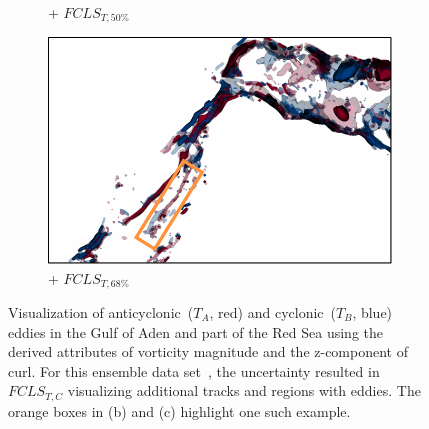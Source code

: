 \begin{figure}[!h]
\begin{subfigure}{0.245\linewidth}
\vspace{-5mm}
\caption{+ $FCLS_{T,50\%}$}
\label{fig:rse_fls}
\end{subfigure}
\begin{subfigure}{0.245\linewidth}
\centering
\includegraphics[width=\linewidth]{Images/RedSeaEddy/fcls_68.pdf}
\vspace{-5mm}
\caption{+ $FCLS_{T,68\%}$}
\label{fig:rse_fcls}
\end{subfigure}
\vspace{-2mm}
\caption{Visualization of anticyclonic~($T_{A}$, red) and cyclonic~($T_{B}$, blue) eddies in the Gulf of Aden and part of the Red Sea using the derived attributes of vorticity magnitude and the z-component of curl. For this ensemble data set~\cite{sanikommu2020impact}, the uncertainty resulted in $FCLS_{T,C}$ visualizing additional tracks and regions with eddies. The orange boxes in (b) and (c) highlight one such example.}
\label{fig:rse}
\end{figure}
